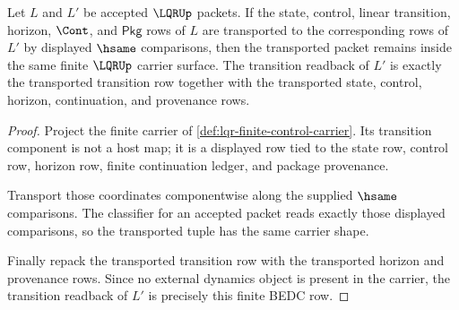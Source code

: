 \begin{theorem}
\label{thm:lqr-transition-stability}
Let $L$ and $L'$ be accepted $\LQRUp$ packets. If the state, control, linear
transition, horizon, $\Cont$, and $\mathsf{Pkg}$ rows of $L$ are transported
to the corresponding rows of $L'$ by displayed $\hsame$ comparisons, then the
transported packet remains inside the same finite $\LQRUp$ carrier surface.
The transition readback of $L'$ is exactly the transported transition row
together with the transported state, control, horizon, continuation, and
provenance rows.
\end{theorem}
\begin{proof}
Project the finite carrier of \autoref{def:lqr-finite-control-carrier}. Its
transition component is not a host map; it is a displayed row tied to the
state row, control row, horizon row, finite continuation ledger, and package
provenance.

Transport those coordinates componentwise along the supplied $\hsame$
comparisons. The classifier for an accepted packet reads exactly those
displayed comparisons, so the transported tuple has the same carrier shape.

Finally repack the transported transition row with the transported horizon
and provenance rows. Since no external dynamics object is present in the
carrier, the transition readback of $L'$ is precisely this finite BEDC row.
\end{proof}

